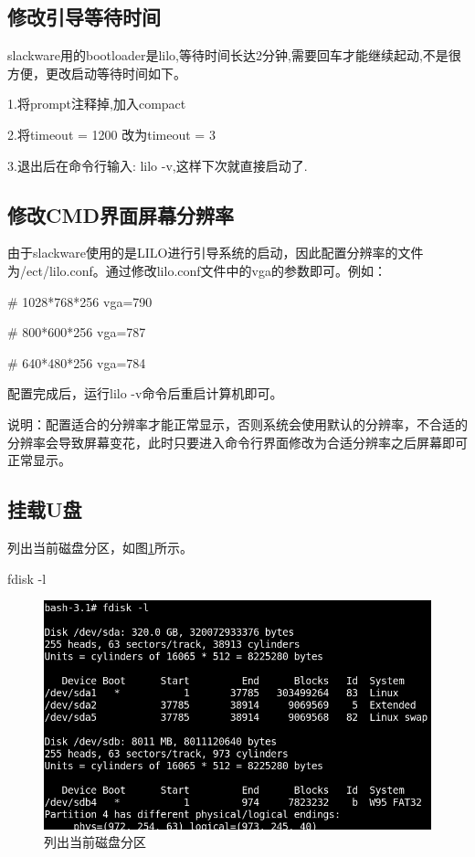 \documentclass[paper=a4,fontsize=11pt]{article}
\begin{document}
	\subsection{修改引导等待时间}
	
	slackware用的bootloader是lilo,等待时间长达2分钟,需要回车才能继续起动,不是很方便，更改启动等待时间如下。
	
	1.将prompt注释掉,加入compact
	
	2.将timeout = 1200 改为timeout = 3
	
	3.退出后在命令行输入: lilo -v,这样下次就直接启动了.
	
	\subsection{修改CMD界面屏幕分辨率}
	
	由于slackware使用的是LILO进行引导系统的启动，因此配置分辨率的文件为/ect/lilo.conf。通过修改lilo.conf文件中的vga的参数即可。例如：
	
	\# 1028*768*256 
	vga=790 
	
	\# 800*600*256
	vga=787
	
	\# 640*480*256
	vga=784
	
	配置完成后，运行lilo -v命令后重启计算机即可。
	
	说明：配置适合的分辨率才能正常显示，否则系统会使用默认的分辨率，不合适的分辨率会导致屏幕变花，此时只要进入命令行界面修改为合适分辨率之后屏幕即可正常显示。
	
	\subsection{挂载U盘}
	
	列出当前磁盘分区，如图\ref{fdisklist}所示。
	
	fdisk -l
	
	\begin{figure}[htbp]
		\centering
		\includegraphics[scale=0.5]{fdisklist.png}
		\caption{列出当前磁盘分区}
		\label{fdisklist}
	\end{figure}
	
\end{document}
